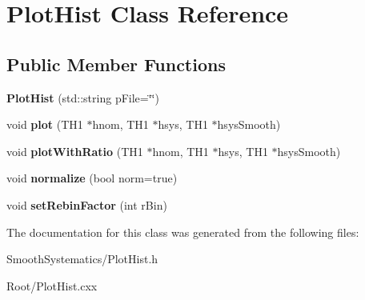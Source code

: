 \hypertarget{classPlotHist}{
\section{PlotHist Class Reference}
\label{classPlotHist}
}
\subsection*{Public Member Functions}
\begin{DoxyCompactItemize}
\item 
\hypertarget{classPlotHist_a0f21a5bb97da5e6d74cd495e2ee1ea12}{
{\bfseries PlotHist} (std::string pFile=\char`\"{}\char`\"{})}
\label{classPlotHist_a0f21a5bb97da5e6d74cd495e2ee1ea12}

\item 
\hypertarget{classPlotHist_aab2e74de6da8f10e5875e786f4f9434d}{
void {\bfseries plot} (TH1 $\ast$hnom, TH1 $\ast$hsys, TH1 $\ast$hsysSmooth)}
\label{classPlotHist_aab2e74de6da8f10e5875e786f4f9434d}

\item 
\hypertarget{classPlotHist_a4a1c0b4662253657aa64cbeea8af0bab}{
void {\bfseries plotWithRatio} (TH1 $\ast$hnom, TH1 $\ast$hsys, TH1 $\ast$hsysSmooth)}
\label{classPlotHist_a4a1c0b4662253657aa64cbeea8af0bab}

\item 
\hypertarget{classPlotHist_a453886df7a45180d91e4eff42442db95}{
void {\bfseries normalize} (bool norm=true)}
\label{classPlotHist_a453886df7a45180d91e4eff42442db95}

\item 
\hypertarget{classPlotHist_ad16d320fde14f31bce8ef651159e21d4}{
void {\bfseries setRebinFactor} (int rBin)}
\label{classPlotHist_ad16d320fde14f31bce8ef651159e21d4}

\end{DoxyCompactItemize}


The documentation for this class was generated from the following files:\begin{DoxyCompactItemize}
\item 
SmoothSystematics/PlotHist.h\item 
Root/PlotHist.cxx\end{DoxyCompactItemize}
